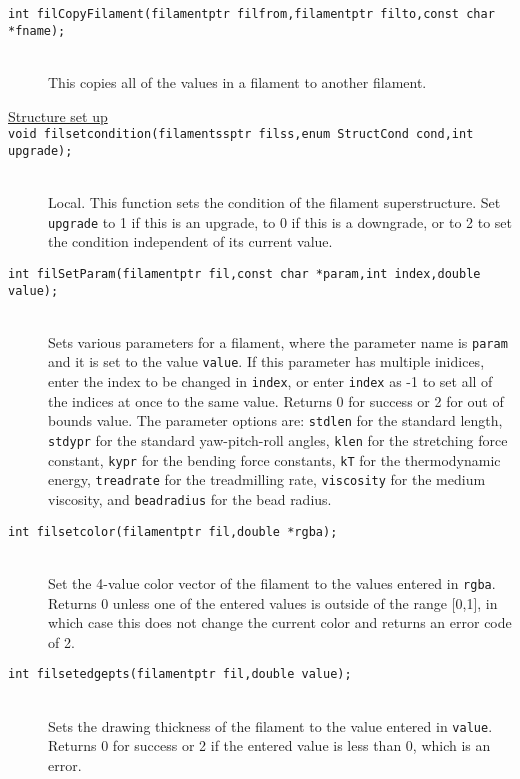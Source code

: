 \documentclass {book}
\begin{document}
\begin{description}
\item[\texttt{int filCopyFilament(filamentptr filfrom,filamentptr filto,const char *fname);}]
\hfill \\
This copies all of the values in a filament to another filament.

\item[\underline{Structure set up}]

\item[\texttt{void filsetcondition(filamentssptr filss,enum StructCond cond,int upgrade);}]
\hfill \\
Local.  This function sets the condition of the filament superstructure.  Set \texttt{upgrade} to 1 if this is an upgrade, to 0 if this is a downgrade, or to 2 to set the condition independent of its current value.

\item[\texttt{int filSetParam(filamentptr fil,const char *param,int index,double value);}]
\hfill \\
Sets various parameters for a filament, where the parameter name is \texttt{param} and it is set to the value \texttt{value}.  If this parameter has multiple inidices, enter the index to be changed in \texttt{index}, or enter \texttt{index} as -1 to set all of the indices at once to the same value.  Returns 0 for success or 2 for out of bounds value.  The parameter options are: \texttt{stdlen} for the standard length, \texttt{stdypr} for the standard yaw-pitch-roll angles, \texttt{klen} for the stretching force constant, \texttt{kypr} for the bending force constants, \texttt{kT} for the thermodynamic energy, \texttt{treadrate} for the treadmilling rate, \texttt{viscosity} for the medium viscosity, and \texttt{beadradius} for the bead radius.

\item[\texttt{int filsetcolor(filamentptr fil,double *rgba);}]
\hfill \\
Set the 4-value color vector of the filament to the values entered in \texttt{rgba}.  Returns 0 unless one of the entered values is outside of the range [0,1], in which case this does not change the current color and returns an error code of 2.

\item[\texttt{int filsetedgepts(filamentptr fil,double value);}]
\hfill \\
Sets the drawing thickness of the filament to the value entered in \texttt{value}.  Returns 0 for success or 2 if the entered value is less than 0, which is an error.


\end{description}
\end{document}
